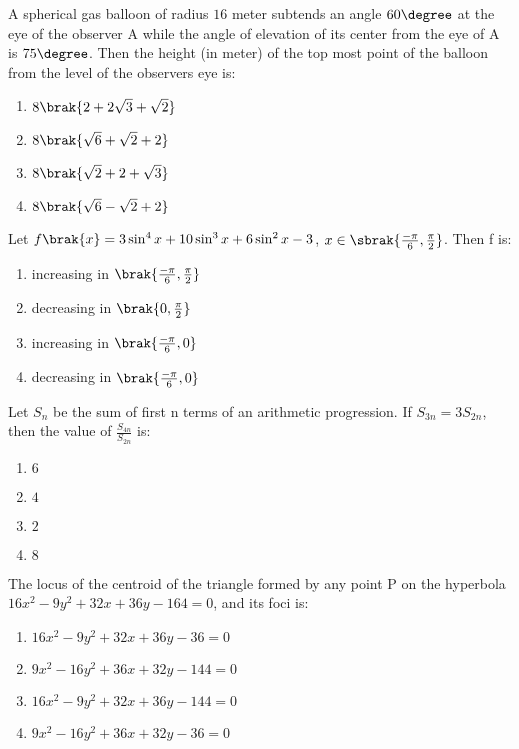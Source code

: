 
\iffalse
  \title{Assignment}
  \author{EE24BTECH11032}
  \section{mcq-single}
\fi
    \item A spherical gas balloon of radius $16$ meter subtends an angle $60\degree$ at the eye of the observer A while the angle of elevation of its center from the eye of A is $75\degree$. Then the height (in meter) of the top most point of the balloon from the level of the observers eye is: \hfill{}
		\begin{enumerate}
			\item $8\brak{2+2\sqrt{3}+\sqrt{2}}$
			\item $8\brak{\sqrt{6}+\sqrt{2}+2}$
			\item $8\brak{\sqrt{2}+2+\sqrt{3}}$
			\item $8\brak{\sqrt{6}-\sqrt{2}+2}$
		\end{enumerate}
	\item Let $f\brak{x}=3\sin^4{x}+10\sin^3{x}+6\sin^2{x}-3$, $x \in \sbrak{\frac{-\pi}{6}, \frac{\pi}{2}}$. Then f is: \hfill{}
		\begin{enumerate}
			\item increasing in $\brak{\frac{-\pi}{6},\frac{\pi}{2}}$
			\item decreasing in $\brak{0,\frac{\pi}{2}}$
			\item increasing in $\brak{\frac{-\pi}{6},0}$
			\item decreasing in $\brak{\frac{-\pi}{6},0}$
		\end{enumerate}
    \item Let $S_n$ be the sum of first n terms of an arithmetic progression. If $S_{3n}=3S_{2n}$, then the value of $\frac{S_{4n}}{S_{2n}}$ is: \hfill{}
    \begin{enumerate}
        \item $6$
        \item $4$
        \item $2$
        \item $8$
    \end{enumerate}
    \item The locus of the centroid of the triangle formed by any point P on the hyperbola $16x^2-9y^2+32x+36y-164=0$, and its foci is: \hfill{}
    \begin{enumerate}
        \item $16x^2-9y^2+32x+36y-36=0$
        \item $9x^2-16y^2+36x+32y-144=0$
        \item $16x^2-9y^2+32x+36y-144=0$
        \item $9x^2-16y^2+36x+32y-36=0$
    \end{enumerate}
